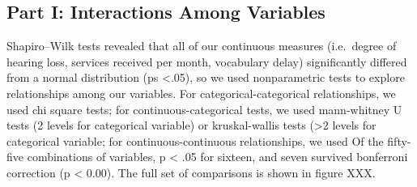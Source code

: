 \documentclass[english,man,floatsintext]{apa6}
\begin{document}
\hypertarget{part-i-interactions-among-variables}{%
\subsection{Part I: Interactions Among Variables}\label{part-i-interactions-among-variables}}

Shapiro--Wilk tests revealed that all of our continuous measures (i.e.~degree of hearing loss, services received per month, vocabulary delay) significantly differed from a normal distribution (ps \textless{}.05), so we used nonparametric tests to explore relationships among our variables. For categorical-categorical relationships, we used chi square tests; for continuous-categorical tests, we used mann-whitney U tests (2 levels for categorical variable) or kruskal-wallis tests (\textgreater{}2 levels for categorical variable; for continuous-continuous relationships, we used Of the fifty-five combinations of variables, p \textless{} .05 for sixteen, and seven survived bonferroni correction (p \textless{} 0.00). The full set of comparisons is shown in figure XXX.
\end{document}
